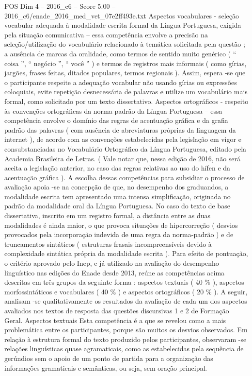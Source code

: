 \begin{textsample}{POS Dim 4 – 2016\_c6 – Score 5.00 – 2016\_c6/enade\_2016\_med\_vet\_07e2ff493e.txt}
Aspectos vocabulares - seleção vocabular adequada à modalidade escrita formal da Língua Portuguesa, exigida pela situação comunicativa – essa competência envolve a precisão na seleção/utilização do vocabulário relacionado à temática solicitada pela questão ; a ausência de marcas da oralidade, como termos de sentido muito genérico ( “ coisa ”, “ negócio ”, “ você ” ) e termos de registros mais informais ( como gírias, jargões, frases feitas, ditados populares, termos regionais ).
Assim, espera -se que o participante respeite a adequação vocabular não usando gírias ou expressões coloquiais, evite repetição desnecessária de palavras e utilize um vocabulário mais formal, como solicitado por um texto dissertativo.
Aspectos ortográficos - respeito às convenções ortográficas da norma-padrão da Língua Portuguesa – essa competência envolve o domínio das regras de acentuação gráfica e da grafia padrão das palavras ( com ausência de abreviaturas próprias da linguagem da internet ), de acordo com as convenções estabelecidas pela legislação em vigor e consubstanciadas no Vocabulário Ortográfico da Língua Portuguesa, editado pela Academia Brasileira de Letras. ( Vale notar que, nessa edição de 2016, não será aceita a legislação anterior, no caso das regras relativas ao uso do hífen e da acentuação gráfica ).
A escolha dessas competências para subsidiar o processo de avaliação apoia -se na concepção de que, no desempenho dos graduandos, a modalidade escrita tem apresentado uma intensa simplificação, originada no padrão da modalidade oral da Língua Portuguesa.
No caso do texto de base dissertativa, inscrito em um registro formal, a distância entre as duas modalidades é ainda maior, o que provoca situações de hipercorreção ( desvios provocados pela incorporação indevida de uma regra da norma-padrão ) e de truncamentos sintáticos ( estruturas frasais incompreensíveis devido à complexidade sintática própria da modalidade escrita ).
Para efeito de pontuação, o critério aprovado pelo Inep, e já utilizado na avaliação do desempenho linguístico nas edições do Enade desde 2013, reúne as competências acima descritas em três grupos da seguinte forma : aspectos textuais ( 40 \% ), aspectos morfossintáticos e vocabulares ( 40 \% ) e aspectos ortográficos ( 20 \% ).
A seguir, analisam -se qualitativamente os resultados da avaliação de cada um dos aspectos avaliados nos textos de resposta das questões discursivas 1 e 2 de Formação Geral.
Aspectos textuais Esta competência é a que se revelou como a mais problemática entre os participantes, porque são muitos os desvios observados.
Em relação à estrutura formal do texto produzido pelos participantes, observaram -se relações linguísticas quase agramaticais, como as estabelecidas pela sequência de gerúndios sem o apoio de um ponto de partida para a organização das informações gramaticais e semânticas, ou seja, sem oração principal.

\end{textsample}
